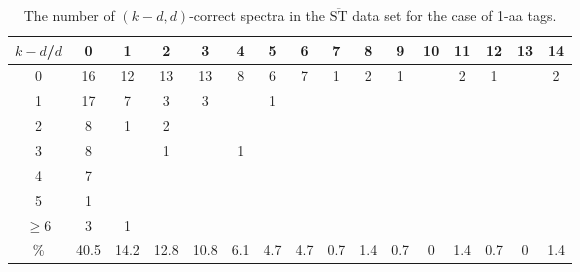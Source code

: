 \documentclass{article}[12pt]
\def\STbar{{\overline{\mathrm{ST}}}}
\begin{document}
\begin{landscape}

\begin{table}[h]\footnotesize
{\centering
\begin{tabular}{|c|c|
c|c|c|c|c|c|c|c|c|c|c|c|c|c|}
  \hline
  $k-d$/$d$ 
 & 0 & 1 & 2 & 3 & 4 & 5 & 6 & 7 & 8 & 9 & 10 & 11 & 12 & 13 & 14\\

  \hline
  \hline

0 & 16 & 12 & 13 & 13 & 8 & 6 & 7 & 1 & 2 & 1 &  & 2 & 1 &  & 2\\

1 & 17 & 7 & 3 & 3 &  & 1 &  &  &  &  &  &  &  &  & \\

2 & 8 & 1 & 2 &  &  &  &  &  &  &  &  &  &  &  & \\

3 & 8 &  & 1 &  & 1 &  &  &  &  &  &  &  &  &  & \\

4 & 7 &  &  &  &  &  &  &  &  &  &  &  &  &  & \\

5 & 1 &  &  &  &  &  &  &  &  &  &  &  &  &  & \\

$\ge6 $  & 3 & 1 &  &  &  &  &  &  &  &  &  &  &  &  & \\

  \hline

 \%  & 40.5 & 14.2 & 12.8 & 10.8 & 6.1 & 4.7 & 4.7 & 0.7 & 1.4 & 0.7 & 0 & 1.4 & 0.7 & 0 & 1.4\\

  \hline
\end{tabular}
\par}
\centering
\caption{The number of $(k-d,d)$-correct spectra in the $\STbar$ data set for the case of 1-aa tags.}
\vspace{3mm}
\label{table:kd-1-correct-ST-bar2}
\end{table}
\end{landscape}
\end{document}
